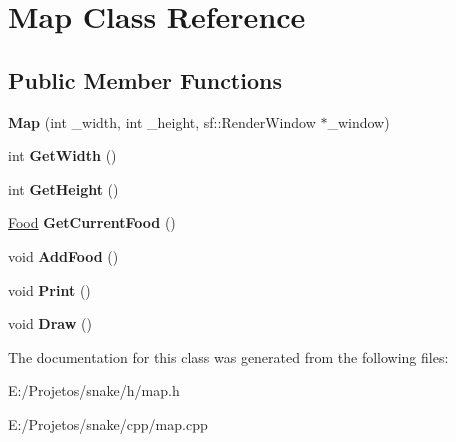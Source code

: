 \hypertarget{class_map}{}\section{Map Class Reference}
\label{class_map}
\subsection*{Public Member Functions}
\begin{DoxyCompactItemize}
\item 
\hypertarget{class_map_a156a2f4d198732e4bffcf290937c4173}{}{\bfseries Map} (int \+\_\+width, int \+\_\+height, sf\+::\+Render\+Window $\ast$\+\_\+window)\label{class_map_a156a2f4d198732e4bffcf290937c4173}

\item 
\hypertarget{class_map_aeca77ed7c01dec1e8effa05f0e08c266}{}int {\bfseries Get\+Width} ()\label{class_map_aeca77ed7c01dec1e8effa05f0e08c266}

\item 
\hypertarget{class_map_a72adf4e41e8e6558e58c2efe20445f7f}{}int {\bfseries Get\+Height} ()\label{class_map_a72adf4e41e8e6558e58c2efe20445f7f}

\item 
\hypertarget{class_map_a980b5ac43ae2bbd07a655e710c03f934}{}\hyperlink{struct_food}{Food} {\bfseries Get\+Current\+Food} ()\label{class_map_a980b5ac43ae2bbd07a655e710c03f934}

\item 
\hypertarget{class_map_a5ad975d64652f60358b926a40cea895d}{}void {\bfseries Add\+Food} ()\label{class_map_a5ad975d64652f60358b926a40cea895d}

\item 
\hypertarget{class_map_adee61225530fb1dddc079bc52337639f}{}void {\bfseries Print} ()\label{class_map_adee61225530fb1dddc079bc52337639f}

\item 
\hypertarget{class_map_a0bdab1f7f4c26a682c5d2a3256ee19c4}{}void {\bfseries Draw} ()\label{class_map_a0bdab1f7f4c26a682c5d2a3256ee19c4}

\end{DoxyCompactItemize}


The documentation for this class was generated from the following files\+:\begin{DoxyCompactItemize}
\item 
E\+:/\+Projetos/snake/h/map.\+h\item 
E\+:/\+Projetos/snake/cpp/map.\+cpp\end{DoxyCompactItemize}
